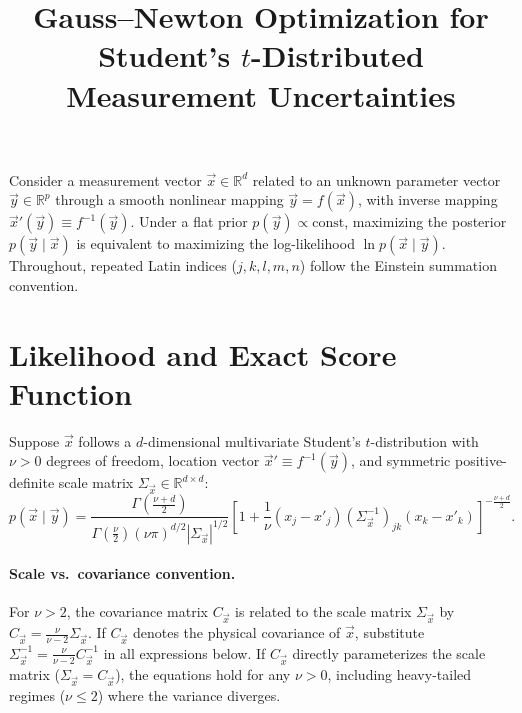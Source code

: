 \documentclass[11pt, a4paper]{article}
\title{Gauss--Newton Optimization for Student's $t$-Distributed Measurement Uncertainties}
\author{}
\date{}
\begin{document}
\maketitle

Consider a measurement vector $\vec{x} \in \mathbb{R}^d$ related to an unknown parameter vector $\vec{y} \in \mathbb{R}^p$ through a smooth nonlinear mapping $\vec{y} = f(\vec{x})$, with inverse mapping $\vec{x}'(\vec{y}) \equiv f^{-1}(\vec{y})$. Under a flat prior $p(\vec{y}) \propto \text{const}$, maximizing the posterior $p(\vec{y} \mid \vec{x})$ is equivalent to maximizing the log-likelihood $\ln p(\vec{x} \mid \vec{y})$. Throughout, repeated Latin indices ($j, k, l, m, n$) follow the Einstein summation convention.

\section{Likelihood and Exact Score Function}

Suppose $\vec{x}$ follows a $d$-dimensional multivariate Student's $t$-distribution with $\nu > 0$ degrees of freedom, location vector $\vec{x}' \equiv f^{-1}(\vec{y})$, and symmetric positive-definite scale matrix $\Sigma_{\vec{x}} \in \mathbb{R}^{d \times d}$:
\begin{equation}
p(\vec{x} \mid \vec{y}) = \frac{\Gamma\!\left(\frac{\nu + d}{2}\right)}{\Gamma\!\left(\frac{\nu}{2}\right) (\nu \pi)^{d/2} |\Sigma_{\vec{x}}|^{1/2}} \left[ 1 + \frac{1}{\nu} (x_j - x'_j) (\Sigma_{\vec{x}}^{-1})_{jk} (x_k - x'_k) \right]^{-\frac{\nu + d}{2}}.
\end{equation}

\paragraph{Scale vs.\ covariance convention.}
For $\nu > 2$, the covariance matrix $C_{\vec{x}}$ is related to the scale matrix $\Sigma_{\vec{x}}$ by $C_{\vec{x}} = \frac{\nu}{\nu - 2} \Sigma_{\vec{x}}$. If $C_{\vec{x}}$ denotes the physical covariance of $\vec{x}$, substitute $\Sigma_{\vec{x}}^{-1} = \frac{\nu}{\nu - 2} C_{\vec{x}}^{-1}$ in all expressions below. If $C_{\vec{x}}$ directly parameterizes the scale matrix ($\Sigma_{\vec{x}} = C_{\vec{x}}$), the equations hold for any $\nu > 0$, including heavy-tailed regimes ($\nu \le 2$) where the variance diverges.
\end{document}
